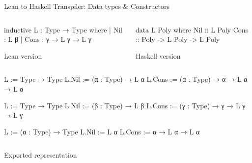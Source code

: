 \begin{frame}[fragile]{Lean to Haskell Transpiler: Data types \& Constructors}
\begin{overprint}
\begin{columns}[T]
\begin{column}{.48\textwidth}
        \begin{LeanCode}
          inductive L : Type → Type
            where
            | Nil : L β
            | Cons : γ → L γ → L γ
        \end{LeanCode}
        \centering
        Lean version
      \end{column}
      \begin{column}{.48\textwidth}
        \begin{HaskellCode}[fontsize=\small]
          data L Poly where
            Nil :: L Poly
            Cons :: Poly -> L Poly
                         -> L Poly
        \end{HaskellCode}
        \centering
        Haskell version
      \end{column}
    \end{columns}
  \end{overprint}

  \vspace{1cm}
  \begin{columns}[T]
    \begin{column}{.65\textwidth}
  \begin{overprint}
    \begin{LeanCode}
      L := Type → Type
      L.Nil := (α : Type) → L α
      L.Cons := (α : Type) → α → L α → L α
    \end{LeanCode}
    \begin{LeanCode}
      L := Type → Type
      L.Nil := (β : Type) → L β
      L.Cons := (γ : Type) → γ → L γ → L γ
    \end{LeanCode}
    \begin{LeanCode}
      L := (α : Type) → Type
      L.Nil := L α
      L.Cons := α → L α → L α
    \end{LeanCode}
  \end{overprint}
      \end{column}
    \end{columns}
  \bigskip
  \begin{overprint}
    \begin{center}
      Exported representation
    \end{center}
  \end{overprint}
\end{frame}

